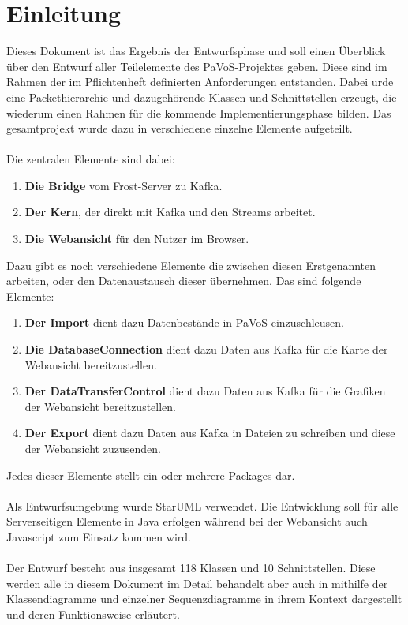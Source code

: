 \chapter{Einleitung}

Dieses Dokument ist das Ergebnis der Entwurfsphase und soll einen Überblick über den Entwurf aller Teilelemente des PaVoS-Projektes geben. Diese sind im Rahmen der im Pflichtenheft definierten Anforderungen entstanden. Dabei urde eine Packethierarchie und dazugehörende Klassen und Schnittstellen erzeugt, die wiederum einen Rahmen für die kommende Implementierungsphase bilden. Das gesamtprojekt wurde dazu in verschiedene einzelne Elemente aufgeteilt.\\\\
Die zentralen Elemente sind dabei:
\begin{enumerate}
	\item \textbf{Die Bridge} vom Frost-Server zu Kafka.
	\item \textbf{Der Kern}, der direkt mit Kafka und den Streams arbeitet.
	\item \textbf{Die Webansicht} für den Nutzer im Browser.
\end{enumerate}
Dazu gibt es noch verschiedene Elemente die zwischen diesen Erstgenannten arbeiten, oder den Datenaustausch dieser übernehmen. Das sind folgende Elemente:
\begin{enumerate}
	\item \textbf{Der Import} dient dazu Datenbestände in PaVoS einzuschleusen.
	\item \textbf{Die DatabaseConnection} dient dazu Daten aus Kafka für die Karte der Webansicht bereitzustellen.
	\item \textbf{Der DataTransferControl} dient dazu Daten aus Kafka für die Grafiken der Webansicht bereitzustellen.
	\item \textbf{Der Export} dient dazu Daten aus Kafka in Dateien zu schreiben und diese der Webansicht zuzusenden.
\end{enumerate}
Jedes dieser Elemente stellt ein oder mehrere Packages dar.\\\\
Als Entwurfsumgebung wurde StarUML verwendet. Die Entwicklung soll für alle Serverseitigen Elemente in Java erfolgen während bei der Webansicht auch Javascript zum Einsatz kommen wird.\\\\
Der Entwurf besteht aus insgesamt 118 Klassen und 10 Schnittstellen. Diese werden alle in diesem Dokument im Detail behandelt aber auch in mithilfe der Klassendiagramme und einzelner Sequenzdiagramme in ihrem Kontext dargestellt und deren Funktionsweise erläutert.
